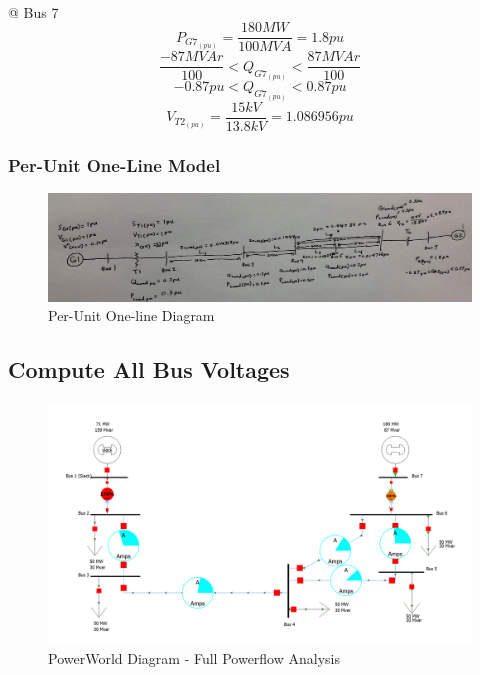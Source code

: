\documentclass[12pt]{article}
\begin{document}
        \ \\
        @ Bus 7
        $$P_{G7_{(pu)}}=\frac{180MW}{100MVA}=\boxed{1.8pu}$$
        $$\frac{-87MVAr}{100}<Q_{G7_{(pu)}}<\frac{87MVAr}{100}$$
        $$-0.87pu<Q_{G7_{(pu)}}<0.87pu$$
        $$V_{T2_{(pu)}}=\frac{15kV}{13.8kV}=\boxed{1.086956pu}$$
        
        \subsubsection{Per-Unit One-Line Model}
        \begin{figure}[H]
            \centerline{\includegraphics[scale=0.5]{images/oneLine}}
            \caption{Per-Unit One-line Diagram}
        \end{figure}

        \subsection{Compute All Bus Voltages}
        \begin{figure}[H]
            \centerline{\includegraphics[scale=0.3]{images/PowerWorld}}
            \caption{PowerWorld Diagram - Full Powerflow Analysis}
        \end{figure}
        
\end{document}
